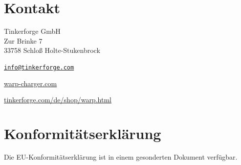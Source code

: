 \documentclass[a4paper,10pt]{article}
\begin{document}
\begin{multicols*}{2}
	\section{Kontakt}
	Tinkerforge GmbH\\ Zur Brinke 7\\ 33758 Schloß Holte-Stukenbrock\\
	\begin{description}[leftmargin=!,labelwidth=\widthof{\textbf{Website}}]
		\item[E-Mail] \href{mailto:info@tinkerforge.com}{\texttt{info@tinkerforge.com}}
		\item[Website] \href{https://warp-charger.com}{warp-charger.com}
		\item[Shop] \href{https://tinkerforge.com/de/shop/warp.html}{tinkerforge.com/de/shop/warp.html}
	\end{description}

	\section{Konformitätserklärung}
	Die EU-Konformitätserklärung ist in einem gesonderten Dokument verfügbar.


\end{multicols*}
\end{document}
